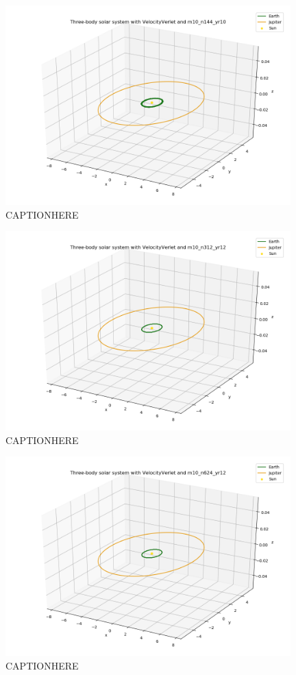 \documentclass{article}
\begin{document}
    \begin{figure}[H]
        \centering
        \includegraphics[width = 11cm]{img/plot3D_S_E_J_V_m10_n144_yr10.png}
        \caption{CAPTIONHERE}
        \label{fig:plot3D_S_E_J_V_m10_n144_yr10}
    \end{figure}

    \begin{figure}[H]
        \centering
        \includegraphics[width = 11cm]{img/plot3D_S_E_J_V_m10_n312_yr12.png}
        \caption{CAPTIONHERE}
        \label{fig:plot3D_S_E_J_V_m10_n312_yr12}
    \end{figure}

    \begin{figure}[H]
        \centering
        \includegraphics[width = 11cm]{img/plot3D_S_E_J_V_m10_n624_yr12.png}
        \caption{CAPTIONHERE}
        \label{fig:plot3D_S_E_J_V_m10_n624_yr12}
    \end{figure}
\end{document}
